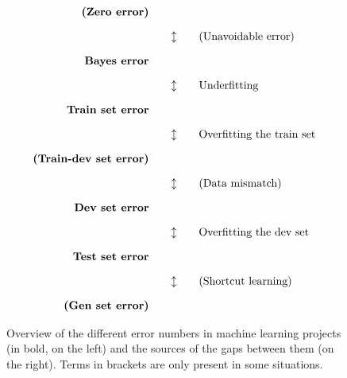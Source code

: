 \documentclass[12pt,openany]{book}
\begin{document}
\begin{figure}[H]
    \centering
    \[
    \begin{array}{r@{\hspace{2em}}c@{\hspace{2em}}l}
        \textbf{(Zero error)} & & \\[1em]
        & \updownarrow & \text{(Unavoidable error)} \\[1em]
        \textbf{Bayes error} & & \\[1em]
        & \updownarrow & \text{Underfitting} \\[1em]
        \textbf{Train set error} & & \\[1em]
        & \updownarrow & \text{Overfitting the train set} \\[1em]
        \textbf{(Train-dev set error)} & & \\[1em]
        & \updownarrow & \text{(Data mismatch)} \\[1em]
        \textbf{Dev set error} & & \\[1em]
        & \updownarrow & \text{Overfitting the dev set} \\[1em]
        \textbf{Test set error} & & \\[1em]
        & \updownarrow & \text{(Shortcut learning)} \\[1em]
        \textbf{(Gen set error)} & & \\
    \end{array}
    \]
    \caption{Overview of the different error numbers in machine learning projects (in bold, on the left) and the sources of the gaps between them (on the right). Terms in brackets are only present in some situations.}
    \label{fig:error-hierarchy}
\end{figure}
\end{document}
